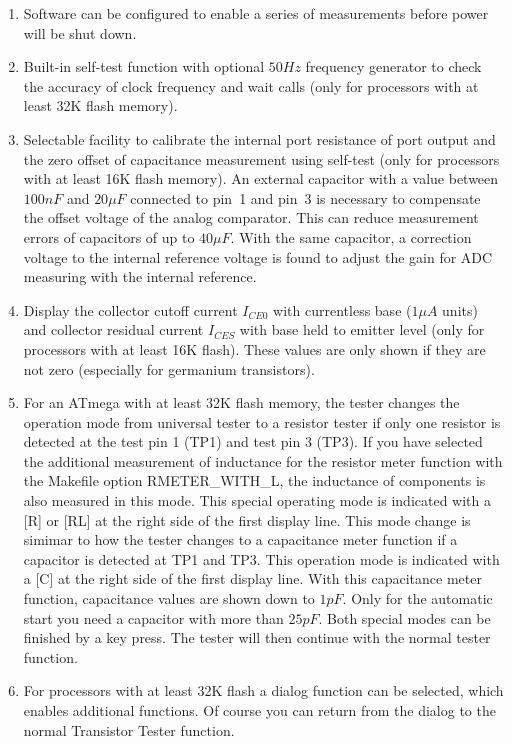 \begin{enumerate}
\item Software can be configured to enable a series of measurements before power will be shut down.
\item Built-in self-test function with optional \(50Hz\) frequency generator to check the accuracy of clock frequency and wait calls (only for processors with at least 32K flash memory).
\item Selectable facility to calibrate the internal port resistance of port output and
the zero offset of capacitance measurement using self-test (only for processors with at least 16K flash memory).
An external capacitor with a value between \(100nF\) 
and \(20\mu F\) connected to pin~1 and pin~3 is necessary to compensate the offset voltage of the analog comparator.
This can reduce measurement errors of capacitors of up to \(40\mu F\).
With the same capacitor, a correction voltage to the internal reference voltage is found to adjust the
gain for ADC measuring with the internal reference.
\item Display the collector cutoff current \(I_{CE0}\) with currentless base (\(1\mu A\) units) and
collector residual current \(I_{CES}\) with base held to emitter level (only for processors with at least 16K flash).
These values are only shown if they are not zero (especially for germanium transistors).
\item For an ATmega with at least 32K flash memory, the tester changes the operation mode from universal tester
to a resistor tester if only one resistor is detected at the test pin 1 (TP1) and test pin 3 (TP3).
If you have selected the additional measurement of inductance for the resistor meter function with the 
Makefile option RMETER\_WITH\_L, the inductance of components is also measured in this mode.
This special operating mode is indicated with a [R] or [RL] at the right side of the first display line.
This mode change is simimar to how the tester changes to a capacitance meter function if a capacitor is detected at TP1 and TP3.
This operation mode is indicated with a [C] at the right side of the first display line.
With this capacitance meter function, capacitance values are shown down to \(1pF\). Only for the automatic
start you need a capacitor with more than \(25pF\).
Both special modes can be finished by a key press. 
The tester will then continue with the normal tester function.
\item For processors with at least 32K flash a dialog function can be selected, which enables additional functions.
Of course you can return from the dialog to the normal Transistor Tester function.

\end{enumerate}
